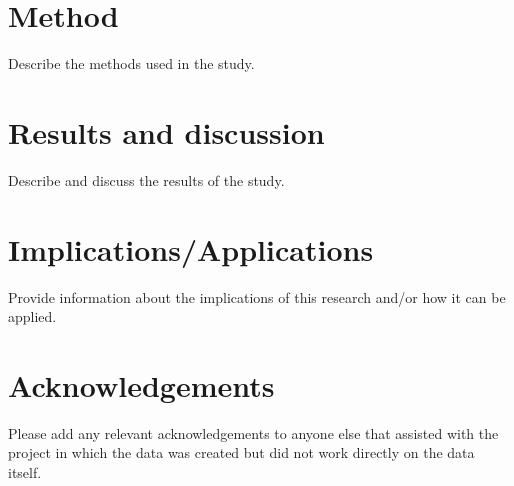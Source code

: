 \documentclass{article}
\begin{document}
\section{Method}
Describe the methods used in the study.

\section{Results and discussion}
Describe and discuss the results of the study.

\section{Implications/Applications}
Provide information about the implications of this research and/or how it can be applied.

\section*{Acknowledgements}
Please add any relevant acknowledgements to anyone else that assisted with the project in which the data was created but did not work directly on the data itself.




\end{document}
